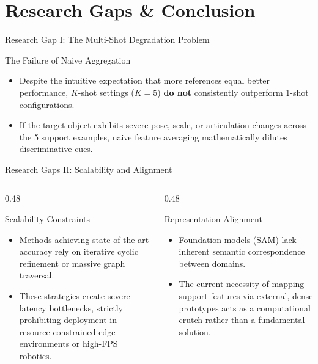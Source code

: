 \documentclass[aspectratio=169, 10pt]{beamer}
\begin{document}
\section{Research Gaps \& Conclusion}

\begin{frame}{Research Gap I: The Multi-Shot Degradation Problem}
    \begin{alertblock}{The Failure of Naive Aggregation}
        \begin{itemize}
            \item Despite the intuitive expectation that more references equal better performance, $K$-shot settings ($K=5$) \textbf{do not} consistently outperform 1-shot configurations.
            \item If the target object exhibits severe pose, scale, or articulation changes across the 5 support examples, naive feature averaging mathematically dilutes discriminative cues.
        \end{itemize}
    \end{alertblock}
\end{frame}

\begin{frame}{Research Gaps II: Scalability and Alignment}
    \begin{columns}[T]
        \begin{column}{0.48\textwidth}
            \begin{alertblock}{Scalability Constraints}
                \begin{itemize}
                    \item Methods achieving state-of-the-art accuracy rely on iterative cyclic refinement or massive graph traversal.
                    \item These strategies create severe latency bottlenecks, strictly prohibiting deployment in resource-constrained edge environments or high-FPS robotics.
                \end{itemize}
            \end{alertblock}
        \end{column}
        
        \begin{column}{0.48\textwidth}
            \begin{alertblock}{Representation Alignment}
                \begin{itemize}
                    \item Foundation models (SAM) lack inherent semantic correspondence between domains.
                    \item The current necessity of mapping support features via external, dense prototypes acts as a computational crutch rather than a fundamental solution.
                \end{itemize}
            \end{alertblock}
        \end{column}
    \end{columns}
\end{frame}
\end{document}
